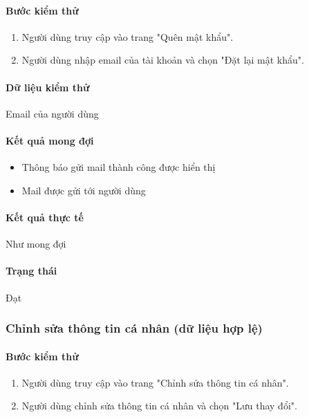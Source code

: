 \documentclass[./../main.tex]{subfiles}
\begin{document}
\paragraph*{Bước kiểm thử}

\begin{enumerate}
    \item Người dùng truy cập vào trang "Quên mật khẩu".
    \item Người dùng nhập email của tài khoản và chọn "Đặt lại mật khẩu".
\end{enumerate}

\paragraph*{Dữ liệu kiểm thử} Email của người dùng

\paragraph*{Kết quả mong đợi}

\begin{itemize}
    \item Thông báo gửi mail thành công được hiển thị
    \item Mail được gửi tới người dùng
\end{itemize}

\paragraph*{Kết quả thực tế} Như mong đợi

\paragraph*{Trạng thái} Đạt

\subsubsection{Chỉnh sửa thông tin cá nhân (dữ liệu hợp lệ)}

\paragraph*{Bước kiểm thử}

\begin{enumerate}
    \item Người dùng truy cập vào trang "Chỉnh sửa thông tin cá nhân".
    \item Người dùng chỉnh sửa thông tin cá nhân và chọn "Lưu thay đổi".
\end{enumerate}
\end{document}
